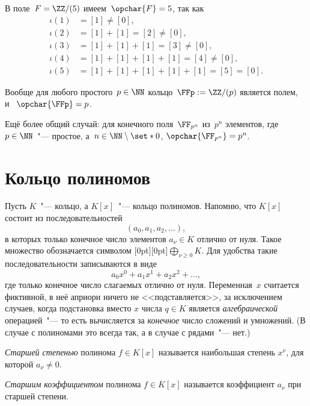 \begin{example}
	В поле~$F = \ZZ/(5)$ имеем~$\opchar{F} = 5$, так как
	\begin{align*}
		\iota(1) &= [1] \neq [0], \\
		\iota(2) &= [1] + [1] = [2] \neq [0], \\
		\iota(3) &= [1] + [1] + [1] = [3] \neq [0], \\
		\iota(4) &= [1] + [1] + [1] + [1] = [4] \neq [0], \\
		\iota(5) &= [1] + [1] + [1] + [1] + [1] = [5] = [0].
	\end{align*}

	Вообще для любого простого~$p \in \NN$ кольцо~$\FFp := \ZZ/(p)$ является полем, и~%
	$
		\opchar{\FFp}
		=
		p
	$.

	Ещё более общий случай: для конечного поля~$\FF_{p^n}$ из~$p^n$ элементов, где~$p \in \NN$~"--- простое, а~$n \in \NN \setminus \set*{0}$, 
	$
		\opchar{\FF_{p^n}} = p^n
	$.
\end{example}

\section{Кольцо полиномов}

Пусть $K$~"--- кольцо, а $K[x]$~"--- кольцо полиномов. Напомню, что $K[x]$ состоит из последовательностей
\[
	(a_0, a_1, a_2, \dots),
\]
в которых только конечное число элементов $a_\nu \in K$ отлично от нуля. Такое множество обозначается символом
\raisebox{0pt}[0pt][0pt]{$
	\bigoplus\limits_{\nu \geq 0} K
$}.
Для удобства такие последовательности записываются в виде
\[
	a_0 x^0 + a_1 x^1 + a_2 x^2 + \dots,
\]
где только конечное число слагаемых отлично от нуля. Переменная~$x$ считается фиктивной, в неё априори ничего не <<подставляется>>, за исключением случаев, когда подстановка вместо $x$ числа $q \in K$ является \emph{алгебраической} операцией~"--- то есть вычисляется за \emph{конечное} число сложений и умножений. (В случае с полиномами это всегда так, а в случае с рядами~"--- нет.)

\begin{definition}
	\emph{Старшей степенью} полинома $f \in K[x]$ называется наибольшая степень $x^\nu$, для которой $a_\nu \neq 0$.
\end{definition}

\begin{definition}
	\emph{Старшим коэффициентом} полинома $f \in K[x]$ называется коэффициент $a_\nu$ при старшей степени.
\end{definition}

